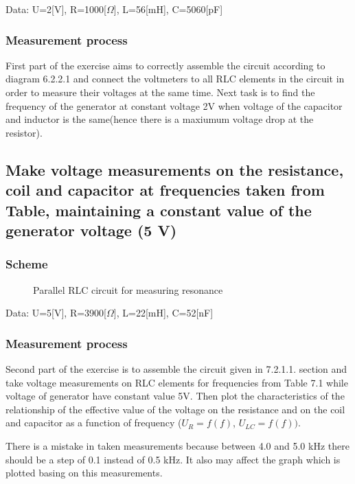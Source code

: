\documentclass[]{scrartcl}
\begin{document}
Data: U=2[V], R=1000[$\Omega$], L=56[mH], C=5060[pF] 

\subsubsection{Measurement process}

First part of the exercise aims to correctly assemble the circuit according to diagram 6.2.2.1 and connect the voltmeters to all RLC elements in the circuit in order to measure their voltages at the same time. Next task is to find the frequency of the generator at constant voltage 2V when voltage of the capacitor and inductor is the same(hence there is a maxiumum voltage drop at the resistor).



\subsection{Make voltage measurements on the resistance, coil and capacitor at frequencies taken from Table, maintaining a constant value of the generator voltage (5 V)}

\subsubsection{Scheme}

\begin{figure}[H]
	\centering
	
	\caption{Parallel RLC circuit for measuring resonance}
	\label{fig:circuitfig_parallel}
\end{figure}

Data: U=5[V], R=3900[$\Omega$], L=22[mH], C=52[nF]

\subsubsection{Measurement process}

Second part of the exercise is to assemble the circuit given in 7.2.1.1. section and take voltage measurements on RLC elements for frequencies from Table 7.1 while voltage of generator have constant value 5V. Then plot the  characteristics of the relationship of the effective value of the voltage on the resistance and on the coil and capacitor as a function of frequency ($U_R=f(f)$, $U_{LC}=f(f))$.



There is a mistake in taken measurements because between 4.0 and 5.0 kHz there should be a step of 0.1 instead of 0.5 kHz. It also may affect the graph which is plotted basing on this measurements. 
\end{document}
